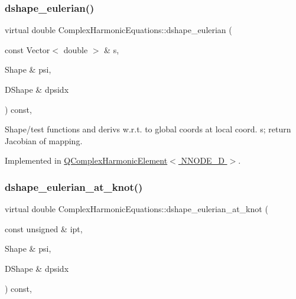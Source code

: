 \subsubsection{\texorpdfstring{dshape\+\_\+eulerian()}{dshape\_eulerian()}}
{\footnotesize\ttfamily virtual double Complex\+Harmonic\+Equations\+::dshape\+\_\+eulerian (\begin{DoxyParamCaption}\item[{const Vector$<$ double $>$ \&}]{s,  }\item[{Shape \&}]{psi,  }\item[{D\+Shape \&}]{dpsidx }\end{DoxyParamCaption}) const\hspace{0.3cm}{\ttfamily [protected]}, {}}



Shape/test functions and derivs w.\+r.\+t. to global coords at local coord. s; return Jacobian of mapping. 



Implemented in \hyperlink{classQComplexHarmonicElement_a7c97d4e8c5433a44640d30c936d69ffb}{Q\+Complex\+Harmonic\+Element$<$ N\+N\+O\+D\+E\+\_\+D $>$}.

\mbox{\label{classComplexHarmonicEquations_a60c71828f2d4c1c2363dcb1d1f334fff}} 
\subsubsection{\texorpdfstring{dshape\+\_\+eulerian\+\_\+at\+\_\+knot()}{dshape\_eulerian\_at\_knot()}}
{\footnotesize\ttfamily virtual double Complex\+Harmonic\+Equations\+::dshape\+\_\+eulerian\+\_\+at\+\_\+knot (\begin{DoxyParamCaption}\item[{const unsigned \&}]{ipt,  }\item[{Shape \&}]{psi,  }\item[{D\+Shape \&}]{dpsidx }\end{DoxyParamCaption}) const\hspace{0.3cm}{\ttfamily [protected]}, {}}



